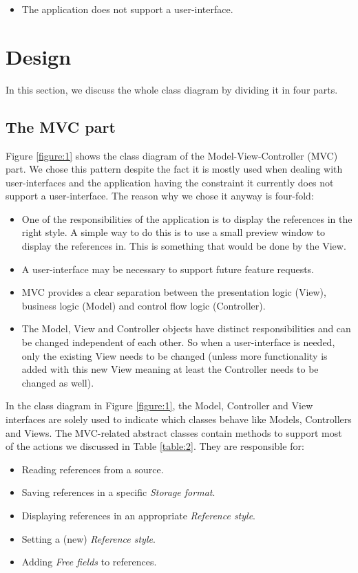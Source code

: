 \documentclass[a4paper]{article}
\begin{document}
\begin{itemize}
	\item The application does not support a user-interface.
\end{itemize}

\section{Design} \label{section:design}
In this section, we discuss the whole class diagram by dividing it in four parts.

\subsection{The MVC part} \label{mvcsection}
Figure \ref{figure:1} shows the class diagram of the Model-View-Controller (MVC) part. We chose this pattern despite the fact it is mostly used when dealing with user-interfaces and the application having the constraint it currently does not support a user-interface. The reason why we chose it anyway is four-fold: 

\begin{itemize}
	\item One of the responsibilities of the application is to display the references in the right style. A simple way to do this is to use a small preview window to display the references in. This is something that would be done by the View.
	\item A user-interface may be necessary to support future feature requests.
	\item MVC provides a clear separation between the presentation logic (View), business logic (Model) and control flow logic (Controller).
	\item The Model, View and Controller objects have distinct responsibilities and can be changed independent of each other. So when a user-interface is needed, only the existing View needs to be changed (unless more functionality is added with this new View meaning at least the Controller needs to be changed as well).
\end{itemize}

In the class diagram in Figure \ref{figure:1}, the Model, Controller and View interfaces are solely used to indicate which classes behave like Models, Controllers and Views. The MVC-related abstract classes contain methods to support most of the actions we discussed in Table \ref{table:2}. They are responsible for:

\begin{itemize}
	\item Reading references from a source.
	\item Saving references in a specific \textit{Storage format}.
	\item Displaying references in an appropriate \textit{Reference style}.
	\item Setting a (new) \textit{Reference style}.
	\item Adding \textit{Free fields} to references.
\end{itemize}
\end{document}
